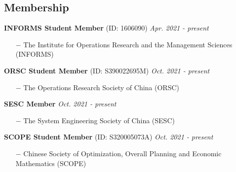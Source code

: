 \documentclass[margin]{res}
\begin{document}
\begin{resume}
\vspace{-.8em}
\section{\sc Membership}


\textbf{INFORMS Student Member} (ID: 1606090) \hfill {\it Apr. 2021 - present}
\begin{itemize}  \itemsep -2pt
\item[\(-\)] The Institute for Operations Research and the Management Sciences (INFORMS)
\end{itemize} 
\vspace{-.8em}

\textbf{ORSC Student Member} (ID: S390022695M) \hfill {\it Oct. 2021 - present}
\begin{itemize}  \itemsep -2pt
\item[\(-\)] The Operations Research Society of China (ORSC)
\end{itemize}
\vspace{-.8em}

\textbf{SESC Member} \hfill {\it Oct. 2021 - present}
\begin{itemize}  \itemsep -2pt
\item[\(-\)] The System Engineering Society of China (SESC)
\end{itemize}
\vspace{-.8em}

\textbf{SCOPE  Student Member} (ID: S320005073A) \hfill {\it Oct. 2021 - present}
\begin{itemize}  \itemsep -2pt
\item[\(-\)] Chinese Society of Optimization, Overall Planning and Economic Mathematics (SCOPE)
\end{itemize}



\end{resume} 
\end{document}
